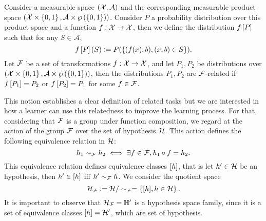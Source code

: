 \begin{definition}\label{def:frel_tasks}
    Consider a measurable space $(\mathcal{X}, \mathcal{A})$ and the corresponding measurable product space $(\mathcal{X} \times \left\{0, 1\right\}, \mathcal{A} \times \wp\left( \left\{0, 1\right\} \right))$. Consider $P$ a probability distribution over this product space and a function $f: \mathcal{X} \to \mathcal{X}$, then we define the distribution $f\left[ P \right]$ such that for any $S \in \mathcal{A}$,
    $$ f\left[ P \right](S) \vcentcolon= P(\left\{(f(x), b), (x, b) \in S \right\}).$$
    Let $\mathcal{F}$ be a set of transformations $f: \mathcal{X} \to \mathcal{X}$, and let $P_1, P_2$ be distributions over $(\mathcal{X} \times \left\{0, 1\right\}, \mathcal{A} \times \wp\left( \left\{0, 1\right\} \right))$, then the distributions $P_1, P_2$ are $\mathcal{F}$-related if $f\left[ P_1 \right]= P_2$ or $f\left[ P_2 \right] = P_1$ for some $f \in \mathcal{F}$.
\end{definition}
This notion establishes a clear definition of related tasks but we are interested in how a learner can use this relatedness to improve the learning process.
For that, considering that $\mathcal{F}$ is a group under function composition, we regard at the action of the group $\mathcal{F}$ over the set of hypothesis $\mathcal{H}$. This action defines the following equivalence relation in $\mathcal{H}$:
$$ h_1 \sim_{\mathcal{F}} h_2 \iff \exists f \in \mathcal{F},  h_1 \circ f = h_2 .$$
%
This equivalence relation defines equivalence classes $\lbrack h\rbrack$, that is let $h' \in \mathcal{H}$ be an hypothesis, then $h' \in \lbrack h\rbrack$ iff $h' \sim_{\mathcal{F}} h$. 
We consider the quotient space 
$$\mathcal{H}_{\mathcal{F}} \vcentcolon= \mathcal{H} / \sim_{\mathcal{F}} = \left\{\lbrack h\rbrack, h \in \mathcal{H}\right\}.$$
It is important to observe that $\mathcal{H}_{\mathcal{F}} = \mathbb{H}'$ is a hypothesis space family, since it is a set of equivalence classes $\lbrack h\rbrack = \mathcal{H}'$, which are set of hypothesis.
%

